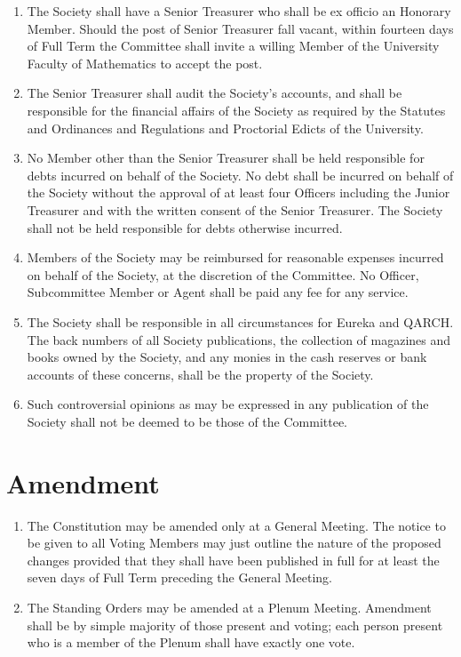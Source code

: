 \documentclass{article}
\begin{document}
\begin{enumerate}
\item The Society shall have a Senior Treasurer who shall be ex officio an Honorary Member. Should the post of Senior Treasurer fall vacant, within
fourteen days of Full Term the Committee shall invite a willing Member
of the University Faculty of Mathematics to accept the post.
\item The Senior Treasurer shall audit the Society's accounts, and shall be responsible for the financial affairs of the Society as required by the Statutes
and Ordinances and Regulations and Proctorial Edicts of the University.
\item No Member other than the Senior Treasurer shall be held responsible for
debts incurred on behalf of the Society. No debt shall be incurred on behalf
of the Society without the approval of at least four Officers including the
Junior Treasurer and with the written consent of the Senior Treasurer.
The Society shall not be held responsible for debts otherwise incurred.
\item Members of the Society may be reimbursed for reasonable expenses incurred on behalf of the Society, at the discretion of the Committee. No
Officer, Subcommittee Member or Agent shall be paid any fee for any
service.
\item The Society shall be responsible in all circumstances for Eureka and QARCH. The back numbers of all Society publications, the collection of magazines and books owned by
the Society, and any monies in the
cash reserves or bank accounts of these concerns, shall be the property of
the Society.
\item Such controversial opinions as may be expressed in any publication of the
Society shall not be deemed to be those of the Committee.
\end{enumerate}


\section{Amendment}

\begin{enumerate}
\item The Constitution may be amended only at a General Meeting. The notice
to be given to all Voting Members may just outline the nature of the
proposed changes provided that they shall have been published in full for
at least the seven days of Full Term preceding the General Meeting.
\item The Standing Orders may be amended at a Plenum Meeting. Amendment shall be by simple majority of those present and voting; each person
present who is a member of the Plenum shall have exactly one vote.
\end{enumerate}
\end{document}
